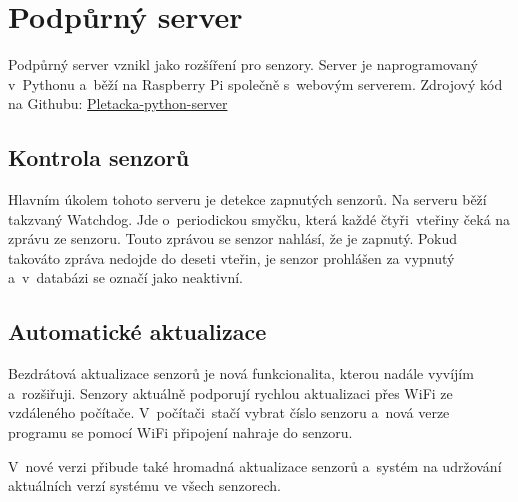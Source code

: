 \chapter{Podpůrný server}
Podpůrný server vznikl jako rozšíření pro senzory.
Server je naprogramovaný v~Pythonu a~běží na Raspberry Pi společně s~webovým serverem.\newline
Zdrojový kód na Githubu: \href{https://github.com/Pletacka-IoT/Pletacka-python-server}{Pletacka-python-server}\cite{PL_PY}


\section{Kontrola senzorů}
Hlavním úkolem tohoto serveru je detekce zapnutých senzorů.
Na serveru běží takzvaný Watchdog.
Jde o~periodickou smyčku, která každé čtyři~vteřiny čeká na zprávu ze senzoru.
Touto zprávou se senzor nahlásí, že je zapnutý. Pokud takováto zpráva nedojde do deseti vteřin, je senzor prohlášen za vypnutý a~v~databázi se označí jako neaktivní.


\section{Automatické aktualizace}
Bezdrátová aktualizace senzorů je nová funkcionalita, kterou nadále vyvíjím a~rozšiřuji.
Senzory aktuálně podporují rychlou aktualizaci přes WiFi ze vzdáleného počítače.
V~počítači~stačí vybrat číslo senzoru a~nová verze programu se pomocí WiFi připojení nahraje do senzoru.

V~nové verzi přibude také hromadná aktualizace senzorů a~systém na udržování aktuálních verzí systému ve všech senzorech.




\newpage